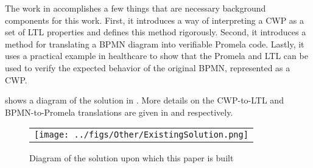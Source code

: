 The work in \cite{mercer22} accomplishes a few things that are necessary background components for this work. First, it introduces a way of interpreting a CWP as a set of LTL properties and defines this method rigorously. Second, it introduces a method for translating a BPMN diagram into verifiable Promela code. Lastly, it uses a practical example in healthcare to show that the Promela and LTL can be used to verify the expected behavior of the original BPMN, represented as a CWP.

 shows a diagram of the solution in \cite{mercer22}. More details on the CWP-to-LTL and BPMN-to-Promela translations are given in  and  respectively.

\begin{figure*}[t]
  \begin{center}
    \begin{tabular}{c}
        \texttt{[image: ../figs/Other/ExistingSolution.png]}
    \end{tabular}
  \end{center}
\caption{Diagram of the solution upon which this paper is built}
\label{fig:existingSolution}
\end{figure*}

